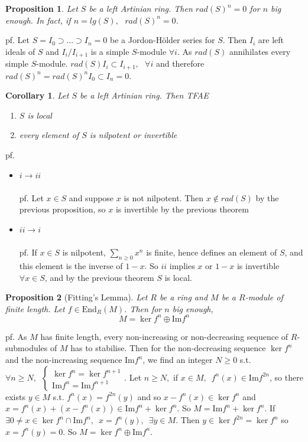 \documentclass[12pt,letterpaper]{report}
\newtheorem{proposition}{Proposition}[section]
\newtheorem{corollary}{Corollary}[section]
\begin{document}
\begin{proposition}Let $S$ be a left Artinian ring. Then $rad(S)^{n}=0$ for $n$ big enough. In fact, if $n=lg(S),\,\,\,\,rad(S)^{n}=0$. \end{proposition}
pf. Let $S=I_{0}\supset\dots\supset I_{n}=0$ be a Jordon-H\"older series for $S$. Then $I_{i}$ are left ideals of $S$ and $I_{i}/I_{i+1}$ is a simple $S$-module $\forall i$. As $rad(S)$ annihilates every simple $S$-module. $rad(S)I_{i}\subset I_{i+1},\,\,\,\,\forall i$ and therefore $rad(S)^{n}=rad(S)^{n}I_{0}\subset I_{n}=0$. 
\begin{corollary}Let $S$ be a left Artinian ring. Then TFAE\begin{enumerate}\item $S$ is local\item every element of $S$ is nilpotent or invertible\end{enumerate}\end{corollary}
pf.\begin{itemize}\item $i\rightarrow ii$
\\\\pf. Let $x\in S$ and suppose $x$ is not nilpotent. Then $x\notin rad(S)$ by the previous proposition, so $x$ is invertible by the previous theorem
\item $ii\rightarrow i$
\\\\pf. If $x\in S$ is nilpotent, $\sum_{n\geq0}x^{n}$ is finite, hence defines an element of $S$, and this element is the inverse of $1-x$. So $ii$ implies $x$ or $1-x$ is invertible $\forall x\in S$, and by the previous theorem $S$ is local.\end{itemize}
\begin{proposition}[Fitting's Lemma]Let $R$ be a ring and $M$ be a $R$-module of finite length. Let $f\in\text{End}_{R}(M)$. Then for $n$ big enough, \begin{equation*}M=\ker f^{n}\oplus\text{Im}f^{n}\end{equation*}\end{proposition}
pf. As $M$ has finite length, every non-increasing or non-decreasing sequence of $R$-submodules of $M$ has to stabilise. Then for the non-decreasing sequence $\ker f^{n}$ and the non-increasing sequence Im$f^{n}$, we find an integer $N\geq0$ s.t. $\forall n\geq N,\,\,\,\left\{\begin{array}{r}\ker f^{n}=\ker f^{n+1}\\\text{Im}f^{n}=\text{Im}f^{n+1}\end{array}\right.$. Let $n\geq N,$ if $x\in M,\,\,\,f^{n}(x)\in \text{Im}f^{2n}$, so there exists $y\in M$ s.t. $f^{n}(x)=f^{2n}(y)$ and so $x-f^{n}(x)\in\ker f^{n}$ and $x=f^{n}(x)+(x-f^{n}(x))\in\text{Im}f^{n}+\ker f^{n}$. So $M=\text{Im}f^{n}+\ker f^{n}$. If $\exists 0\neq x\in \ker f^{n}\cap \text{Im}f^{n},\,\,\,x=f^{n}(y),\,\,\,\exists y\in M$. Then $y\in\ker f^{2n}=\ker f^{n}$ so $x=f^{n}(y)=0$. So $M=\ker f^{n}\oplus \text{Im}f^{n}$.
\end{document}
